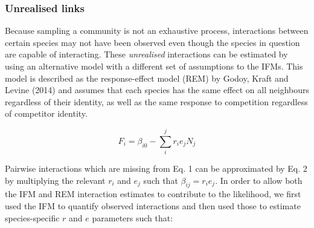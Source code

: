 \documentclass[a4,12pt]{article}
\begin{document}
        


        \subsubsection{Unrealised links}
        
        Because sampling a community is not an exhaustive process, interactions between certain species may not have been observed even though the species in question are capable of interacting. These \textit{unrealised} interactions can be estimated by using an alternative model with a different set of assumptions to the IFMs. This model is described as the response-effect model (REM) by Godoy, Kraft and Levine (2014) and assumes that each species has the same effect on all neighbours regardless of their identity, as well as the same response to competition regardless of competitor identity. 
        
        \begin{equation}
        F_{i} = \beta_{i0} - \sum_{i}^{j} r_{i} e_{j} N_{j}
        \label{rem1}
        \end{equation}
        
        Pairwise interactions which are missing from Eq. 1 can be approximated by Eq. 2 by multiplying the relevant $r_{i}$ and $e_{j}$ such that $\beta_{ij} = r_{i} e_{j}$. In order to allow both the IFM and REM interaction estimates to contribute to the likelihood, we first used the IFM to quantify observed interactions and then used those to estimate species-specific $r$ and $e$ parameters such that: 
    
\end{document}
